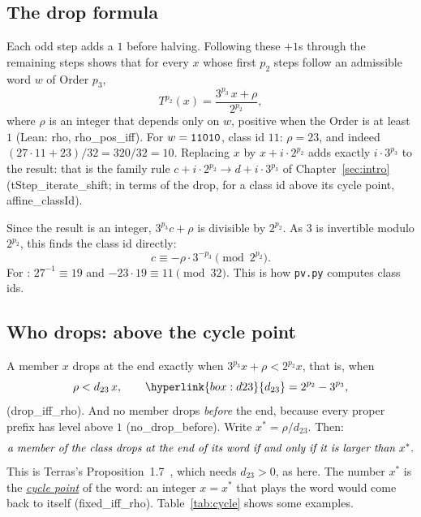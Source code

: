 \documentclass[10pt,a4paper,titlepage]{article}
\makeatletter
\newcommand{\termhere}[1]{\leavevmode
  \Hy@raisedlink{\hyper@anchorstart{term:#1}\hyper@anchorend}}
\newcommand{\keyterm}[2]{\hyperlink{box:#1}{\emph{#2}}}
\newcommand{\keysym}[2]{\hyperlink{box:#1}{#2}}
\newcommand{\lean}[1]{\textsf{#1}}
\makeatother
\begin{document}
\subsection*{The drop formula}
\label{sec:dropformula}

\termhere{rho}Each odd step adds a $1$ before halving. Following these $+1$s through the
remaining steps shows that for every $x$ whose first $p_2$ steps follow an
admissible word $w$ of Order $p_3$,
\[
T^{p_2}(x) = \frac{3^{p_3}\,x + \rho}{2^{p_2}},
\]
where \keysym{rho}{$\rho$} is an integer that depends only on $w$, positive when the Order
is at least $1$ (Lean: \lean{rho}, \lean{rho\_pos\_iff}). For $w = \text{\texttt{11010}}$, class id $11$: $\rho = 23$, and indeed
$(27\cdot 11 + 23)/32 = 320/32 = 10$. Replacing $x$ by $x + i\cdot 2^{p_2}$
adds exactly $i\cdot 3^{p_3}$ to the result: that is the family rule
$c + i\cdot 2^{p_2} \to d + i\cdot 3^{p_3}$ of Chapter~\ref{sec:intro}
(\lean{tStep\_iterate\_shift}; in terms of the drop, for a class id above its
cycle point, \lean{affine\_classId}).

\nopagebreak
Since the result is an integer, $3^{p_3}c + \rho$ is divisible by $2^{p_2}$. As $3$ is
invertible modulo $2^{p_2}$, this finds the class id directly:
\[
c \equiv -\rho \cdot 3^{-p_3} \pmod{2^{p_2}}.
\]
For : $27^{-1} \equiv 19$ and $-23 \cdot 19 \equiv 11 \pmod{32}$. This is
how \texttt{pv.py} computes class ids.

\subsection*{Who drops: above the cycle point}

\termhere{d23}A member $x$ drops at the end exactly when $3^{p_3} x + \rho < 2^{p_2} x$, that
is, when
\[
\rho < d_{23}\, x, \qquad \keysym{d23}{d_{23}} = 2^{p_2} - 3^{p_3},
\]
(\lean{drop\_iff\_rho}). And no member drops \emph{before} the end, because
every proper prefix has level above $1$ (\lean{no\_drop\_before}). \termhere{cyclepoint}Write
$x^* = \rho / d_{23}$. Then:
\[
\text{\emph{a member of the class drops at the end of its word
if and only if it is larger than $x^*$.}}
\]
This is Terras's Proposition~1.7~\cite{Terras1976}, which needs $d_{23} > 0$, as here.
The number $x^*$ is the \keyterm{cyclepoint}{cycle point} of the word: an integer $x = x^*$
that plays the word would come back to itself
(\lean{fixed\_iff\_rho}). Table~\ref{tab:cycle} shows some examples.
\end{document}
